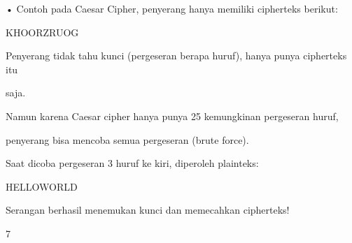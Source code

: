\documentclass{article}
\begin{document}

• Contoh pada Caesar Cipher, penyerang hanya memiliki cipherteks berikut:

                      KHOORZRUOG

   Penyerang tidak tahu kunci (pergeseran berapa huruf), hanya punya cipherteks itu 

saja. 

Namun karena Caesar cipher hanya punya 25 kemungkinan pergeseran huruf, 

penyerang bisa mencoba semua pergeseran (brute force).

Saat dicoba pergeseran 3 huruf ke kiri, diperoleh plainteks:

                 HELLOWORLD

Serangan berhasil menemukan kunci dan memecahkan cipherteks!

7
\end{document}
